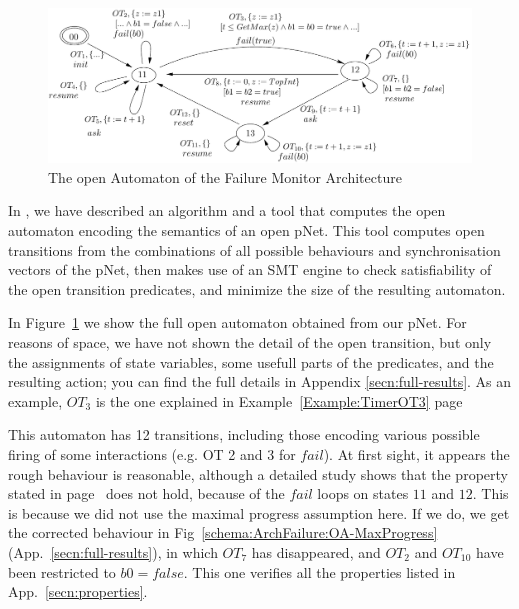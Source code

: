 \documentclass{llncs}
\newcommand{\todoEM}[2][color=blue!40, size=\tiny]{\todo[#1]{\textbf{To-do Eric:} {#2}}}
\newcommand{\app}[1]{App.~\ref{secn:#1}}
\begin{document}
\begin{figure}[t]
  \centering
  \includegraphics[width=0.9\columnwidth]{TimerOADetailed}
  \caption{The open Automaton of the Failure Monitor Architecture}
  \label{schema:ArchFailure:OA}
\end{figure}

In \cite{HMZ-FORTE2016QBMZ-AVOCS18}, we have described an algorithm
and a tool that 
computes the open automaton encoding the semantics of an open
pNet. This tool computes open transitions from the combinations of all
possible behaviours and synchronisation vectors of the pNet, then makes
use of an SMT engine to check satisfiability of the open transition
predicates, and minimize the size of the resulting automaton.



In Figure~\ref{schema:ArchFailure:OA} we show the full open automaton
obtained from our pNet. For reasons of space, we have not shown the
detail of the open transition, but only the assignments of state
variables, some usefull parts of the predicates, and the resulting
action; you can find the full details in 
Appendix \ref{secn:full-results}. As an example, $OT_3$ is the one
explained in Example~\ref{Example:TimerOT3} page~\pageref{Example:TimerOT3}

This automaton has 12 transitions, including those encoding various
possible firing of some interactions (e.g. OT 2 and 3 for
$fail$). At first sight, it appears the rough behaviour is
reasonable, although a detailed study shows that the property stated
in page~\pageref{property:reset} does not hold, because of the
$fail$ loops on states $11$ and $12$. This is because we did not use
the maximal progress assumption here. If we do, we get the corrected
behaviour in Fig~\ref{schema:ArchFailure:OA-MaxProgress}
(\app{full-results}), in which $OT_7$ has 
disappeared, and $OT_2$ and $OT_{10}$ have been restricted to
$b0=false$. This one verifies all the properties listed in
\app{properties}. 
\end{document}
